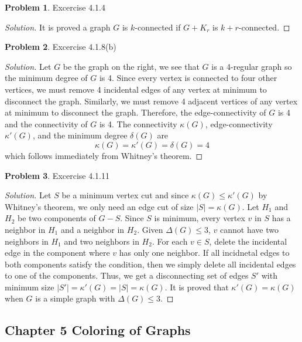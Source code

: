 \documentclass[12pt]{article}
\theoremstyle{definition}
\newtheorem{problem}{Problem}
\newenvironment*{solution}{\begin{proof}[Solution]}{\end{proof}}
\begin{document}
\begin{problem}
    Excercise 4.1.4
\end{problem}
\begin{solution}
    It is proved a graph \(G\) is \(k\)-connected if \(G+K_r\) is
    \(k+r\)-connected.
\end{solution}

\begin{problem}
    Excercise 4.1.8(b)
\end{problem}
\begin{solution}
    Let \(G\) be the graph on the right, we see that \(G\) is a 4-regular
    graph so the minimum degree of \(G\) is 4.
    Since every vertex is connected to four other vertices,
    we must remove 4 incidental edges of any vertex at minimum to disconnect
    the graph.
    Similarly, we must remove 4 adjacent vertices of any vertex at minimum to
    disconnect the graph.
    Therefore, the edge-connectivity of \(G\) is 4 and the connectivity of
    \(G\) is 4.
    The connectivity \(\kappa(G)\), edge-connectivity \(\kappa'(G)\), and the
    minimum degree \(\delta(G)\) are
    \[\kappa(G) = \kappa'(G) = \delta(G) = 4\] which follows immediately from
    Whitney's theorem.
\end{solution}

\begin{problem}
    Excercise 4.1.11
\end{problem}
\begin{solution}
    Let \(S\) be a minimum vertex cut and since \(\kappa(G)\leq\kappa'(G)\) by
    Whitney's theorem, we only need an edge cut of size \(|S|=\kappa(G)\).
    Let \(H_1\) and \(H_2\) be two components of \(G-S\).
    Since \(S\) is minimum, every vertex \(v\) in \(S\) has a neighbor in \(H_1\)
    and a neighbor in \(H_2\).
    Given \(\Delta(G)\leq3\), \(v\) cannot have two neighbors in \(H_1\) and two
    neighbors in \(H_2\).
    For each \(v\in S\), delete the incidental edge in the component where
    \(v\) has only one neighbor.
    If all incidnetal edges to both components satisfy the condition, then we
    simply delete all incidental edges to one of the components.
    Thus, we get a disconnecting set of edges \(S'\) with minimum size
    \(|S'|=\kappa'(G)=|S|=\kappa(G)\).
    It is proved that \(\kappa'(G)=\kappa(G)\) when \(G\) is a simple graph
    with \(\Delta(G)\leq3\).
\end{solution}

\subsection*{Chapter 5 Coloring of Graphs}
\end{document}
